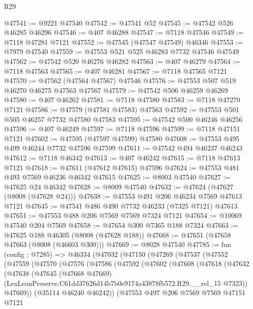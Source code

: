 \begin{lexlean}{R29}
\begin{coremodule}
@47541 := @9221 @47540
@47542 := @47541 @52
@47545 := @47542 @526 @46285 @46296
@47546 := @407 @46288
@47547 := @7118 @47546
@47549 := @7118 @47281 @7121
@47552 := @47545 (@47547 @47549) @46346
@47553 := @7979 @47540
@47559 := @47553 @521 @525 @46283 @7732 @47546 @47549
@47562 := @47542 @520 @46276 @46282
@47563 := @407 @46279
@47564 := @7118 @47563
@47565 := @407 @46281
@47567 := @7118 @47565 @7121
@47570 := @47562 (@47564 @47567) @47546
@47576 := @47553 @507 @519 @46270 @46275 @47563 @47567
@47579 := @47542 @506 @46259 @46269
@47580 := @407 @46262
@47581 := @7118 @47580
@47583 := @7118 @47270 @7121
@47586 := @47579 (@47581 @47583) @47563
@47592 := @47553 @501 @505 @46257 @7732 @47580 @47583
@47595 := @47542 @500 @46246 @46256
@47596 := @407 @46249
@47597 := @7118 @47596
@47599 := @7118 @47151 @7121
@47602 := @47595 (@47597 @47599) @47580
@47608 := @47553 @495 @499 @46244 @7732 @47596 @47599
@47611 := @47542 @494 @46237 @46243
@47612 := @7118 @46342
@47613 := @407 @46242
@47615 := @7118 @47613 @7121
@47618 := @47611 (@47612 @47615) @47596
@47624 := @47553 @481 @493 @7569 @46236 @46342 @47615
@47625 := @8003 @47540
@47627 := @47625 @24 @46342
@47628 := @8009 @47540
@47632 := @47624 (@47627 (@8008 (@47628 @24)))
@47638 := @47553 @491 @206 @46234 @7569 @47613 @7121
@47645 := @47541 @486 @490 @7732 @46233 (@7325 @7121) @47613
@47651 := @47553 @488 @206 @7569 @7569 @7324 @7121
@47654 := @10069 @47540 @204 @7569
@47658 := @47654 @300 @7365 @188 @7324
@47663 := @47625 @188 @46305 (@8008 (@47628 @188))
@47668 := @47651 (@47658 @47663 (@8008 (@46603 @300)))
@47669 := @8028 @47540
@47785 := fun (config : @7285) =>
  @46334
    (@47032
      (@47150
        (@47269
          (@47537
            (@47552
              (@47559
                (@47570
                  (@47576
                    (@47586
                      (@47592
                        (@47602
                          (@47608
                            (@47618
                              (@47632
                                (@47638
                                  (@47645
                                    (@47668 @47669)
                                    (LexLeanPreserve.C61dd37626d14b7b0e9174a43878fb572.R29.__rel_15
                                      @7323))
                                  @47669))
                              (@35114 @46240 @46242))
                            (@47553
                              @497
                              @206
                              @7569
                              @7569
                              @47151
                              @7121

\end{coremodule}
\end{lexlean}
